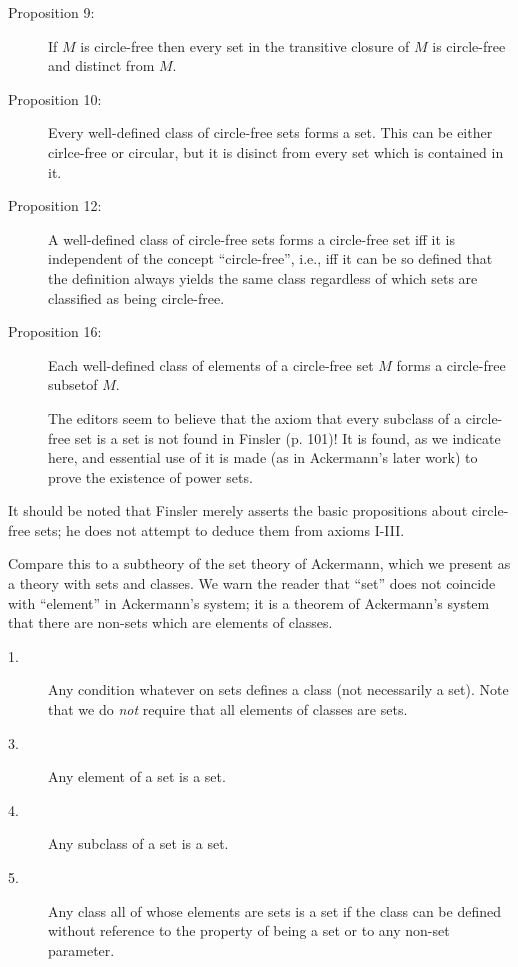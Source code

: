 \begin{description}

\item[Proposition 9:] If $M$ is circle-free then every set in the
transitive closure of $M$ is circle-free and distinct from $M$.

\item[Proposition 10:] Every well-defined class of circle-free sets
forms a set.  This can be either cirlce-free or circular, but it is
disinct from every set which is contained in it.

\item[Proposition 12:] A well-defined class of circle-free sets forms
a circle-free set iff it is independent of the concept
``circle-free'', i.e., iff it can be so defined that the definition
always yields the same class regardless of which sets are classified
as being circle-free.

\item[Proposition 16:] Each well-defined class of elements of a
circle-free set $M$ forms a circle-free subsetof $M$.

The editors seem to believe that the axiom that every subclass of a
circle-free set is a set is not found in Finsler (p. 101)!  It is
found, as we indicate here, and essential use of it is made (as in
Ackermann's later work) to prove the existence of power sets.

\end{description}

It should be noted that Finsler merely asserts the basic propositions
about circle-free sets; he does not attempt to deduce them from axioms
I-III.

Compare this to a subtheory of the set theory of Ackermann, which we
present as a theory with sets and classes.  We warn the reader that
``set'' does not coincide with ``element'' in Ackermann's system; it
is a theorem of Ackermann's system that there are non-sets which are
elements of classes.

\begin{description}

\item[1.]  Any condition whatever on sets defines a class (not
necessarily a set).  Note that we do {\em not\/} require that all
elements of classes are sets.

\item[3.]  Any element of a set is a set.

\item[4.]  Any subclass of a set is a set.

\item[5.]  Any class all of whose elements are sets is a set if the
class can be defined without reference to the property of being a set
or to any non-set parameter.

\end{description}

